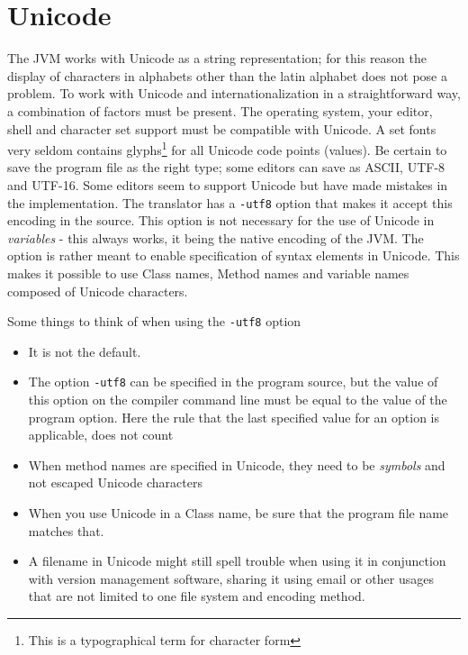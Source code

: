 \chapter{Unicode}
The JVM works with Unicode as a string representation; for this reason the display of characters in alphabets other than the latin alphabet does not pose a problem. To work with Unicode and internationalization in a straightforward way, a combination of factors must be present. The operating system, your editor, shell and character set support must be compatible with Unicode. A set fonts very seldom contains glyphs\footnote{This is a typographical term for character form} for all Unicode code points (values). Be certain to save the program file as the right type; some editors can save as ASCII, UTF-8 and UTF-16. Some editors seem to support Unicode but have made mistakes in the implementation. The \nr{} translator has a \texttt{-utf8} option that makes it accept this encoding in the source. This option is not necessary for the use of Unicode in \emph{variables} - this always works, it being the native encoding of the JVM. The option is rather meant to enable specification of \nr{} syntax elements in Unicode. This makes it possible to use Class names, Method names and variable names composed of Unicode characters.

Some things to think of when using the \texttt{-utf8} option
\begin{itemize}
\item It is not the default.
\item The option \texttt{-utf8} can be specified in the program source, but the value of this option on the compiler command line must be equal to the value of the program option. Here the rule that the last specified value for an option is applicable, does not count
\item When method names are specified in Unicode, they need to be \emph{symbols} and not escaped Unicode characters
\item When you use Unicode in a Class name, be sure that the program file name matches that.
\item A filename in Unicode might still spell trouble when using it in conjunction with version management software, sharing it using email or other usages that are not limited to one file system and encoding method.
\end{itemize}

